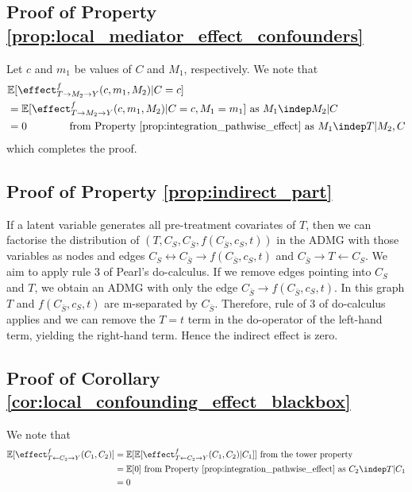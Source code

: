 \fi

\subsection{Proof of Property \ref{prop:local_mediator_effect_confounders}}

\label{proof:local_mediator_effect_confounders}

Let $c$ and $m_1$ be values of $C$ and $M_1$, respectively. We note that
\begin{align*}
    &\mathbb{E}[\effect^f_{T \rightarrow M_2 \rightarrow Y}(c,m_1,M_2) | C=c] \\
    &= \mathbb{E}[\effect^f_{T \rightarrow M_2 \rightarrow Y}(c,m_1,M_2) | C=c, M_1=m_1]  \text{ as } M_1 \indep M_2 | C \\
    &= 0 \ \ \ \ \ \ \ \ \ \ \ \text{ from Property \ref{prop:integration_pathwise_effect} as } M_1 \indep T | M_2, C \\
\end{align*}
which completes the proof.
 

\subsection{Proof of Property \ref{prop:indirect_part}}
\label{proof:indirect_part}

If a latent variable generates all pre-treatment covariates of $T$, then we can factorise the distribution of $(T,C_S,C_{\bar{S}},f\left({C}_{\bar{S}}, c_{S}, t\right))$ in the ADMG with those variables as nodes and edges $C_S \leftrightarrow C_{\bar{S}} \rightarrow f\left({C}_{\bar{S}}, c_{S}, t\right)$ and $C_{\bar{S}} \rightarrow T \gets C_S$.  We aim to apply rule 3 of Pearl's do-calculus. If we remove edges pointing into $C_S$ and $T$, we obtain an ADMG with only the edge $C_{\bar{S}} \rightarrow f\left({C}_{\bar{S}}, c_{S}, t\right)$. In this graph $T$ and $f\left({C}_{\bar{S}}, c_{S}, t\right)$ are m-separated by ${C}_{\bar{S}}$. Therefore, rule of 3 of do-calculus applies and we can remove the $T=t$ term in the do-operator of the left-hand term, yielding the right-hand term. Hence the indirect effect is zero.




\subsection{Proof of Corollary \ref{cor:local_confounding_effect_blackbox}}
\label{proof:local_confounding_effect_blackbox}
We note that
\begin{align*}
    \mathbb{E}[\effect^f_{T \leftarrow C_2 \rightarrow Y}(C_1,C_2)]
    &= \mathbb{E}[\mathbb{E}[\effect^f_{T \leftarrow C_2 \rightarrow Y}(C_1,C_2) | C_1]] \text{ from the tower property} \\
    &= \mathbb{E}[0] \text{ from Property \ref{prop:integration_pathwise_effect} as } C_2 \indep T | C_1 \\
    &= 0 \\
\end{align*}


